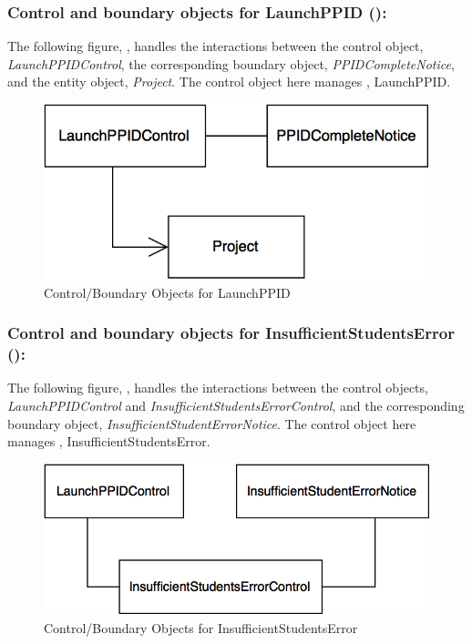 \documentclass[12pt,letterpaper]{article}
\begin{document}
\subsubsection*{Control and boundary objects for LaunchPPID ():}

The following figure, , handles the interactions between the control object, {\it LaunchPPIDControl}, the corresponding boundary object, {\it PPIDCompleteNotice}, and the entity object, {\it Project}. The control object here manages , LaunchPPID.

\begin{figure}[H]
	\centering{}
	\includegraphics[scale=0.37]{imgs/cbod/launch-ppid.png}
	\caption{Control/Boundary Objects for LaunchPPID}
\end{figure}

\subsubsection*{Control and boundary objects for InsufficientStudentsError ():}

The following figure, , handles the interactions between the control objects, {\it LaunchPPIDControl} and {\it InsufficientStudentsErrorControl}, and the corresponding boundary object, {\it InsufficientStudentErrorNotice}. The control object here manages , InsufficientStudentsError.

\begin{figure}[H]
	\centering{}
	\includegraphics[scale=0.37]{imgs/cbod/insufficient-students-error.png}
	\caption{Control/Boundary Objects for InsufficientStudentsError}
\end{figure}
\end{document}
